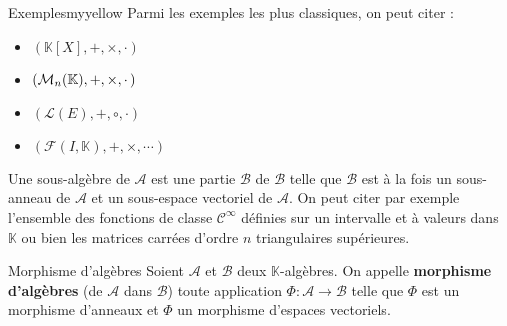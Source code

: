     \begin{omed}{Exemples}{myyellow}
        Parmi les exemples les plus classiques, on peut citer :
        \begin{itemize}
            \item $(\mathbb{K}[X], +, \times, \cdotp)$
            \item $(\mathcal{M}_{n}(\mathbb{K}), +, \times, \cdotp)$
            \item $(\mathcal{L}(E), +, \circ, \cdotp)$
            \item $(\mathcal{F}(I,\mathbb{K}), + , \times, \cdots)$
        \end{itemize}
    \end{omed}

    Une sous-algèbre de $\mathcal{A}$ est une partie $\mathcal{B}$ de $\mathcal{B}$ telle que $\mathcal{B}$ est à la fois un sous-anneau de $\mathcal{A}$ et un sous-espace vectoriel de $\mathcal{A}$. On peut citer par exemple l’ensemble des fonctions de classe $\mathcal{C}^{\infty}$ définies sur un intervalle et à valeurs dans $\mathbb{K}$ ou bien les matrices carrées d’ordre $n$ triangulaires supérieures.

    \begin{defi}{Morphisme d’algèbres}{}
        Soient $\mathcal{A}$ et $\mathcal{B}$ deux $\mathbb{K}$-algèbres. On appelle \textbf{morphisme d’algèbres} (de $\mathcal{A}$ dans $\mathcal{B}$) toute application $\Phi : \mathcal{A} \to \mathcal{B}$ telle que $\Phi$ est un morphisme d’anneaux et $\Phi$ un morphisme d’espaces vectoriels.
    \end{defi}
